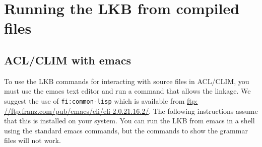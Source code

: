 \documentclass[12pt]{report}
\newcommand{\functionname}[1]{{\tt #1}}
\begin{document}
\section{Running the LKB from compiled files}
\label{compiled}


\subsection{ACL/CLIM with emacs}
\label{acl-emacs}

To use the LKB commands for interacting with source
files in ACL/CLIM, you must use the emacs text editor and
run a command that allows the linkage.  We suggest
the use of \functionname{fi:common-lisp} which is available
from \href{ftp: //ftp.franz.com/pub/emacs/eli/eli-2.0.21.16.2/}{ftp: //ftp.franz.com/pub/emacs/eli/eli-2.0.21.16.2/}.  The following
instructions assume that this is installed on your system.
You can run the LKB from emacs in a shell using the standard
emacs commands, but the commands to show the grammar files
will not work.
\end{document}
